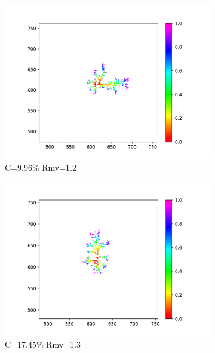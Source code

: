 \documentclass[10pt]{article}
\begin{document}
\begin{figure}[h]
\begin{subfigure}[b]{0.2\textwidth}
		\includegraphics[width=\textwidth]{Figure_10_1.2}
		\caption{C=9.96\% Rmv=1.2}
	\end{subfigure}
	\hfill
	\begin{subfigure}[b]{0.2\textwidth}
		\centering
		\includegraphics[width=\textwidth]{Figure_10_1.3}
		\caption{C=17.45\% Rmv=1.3}
	\end{subfigure}
	\hfill
	\begin{subfigure}[b]{0.2\textwidth}
		\centering

\end{subfigure}
\end{figure}
\end{document}
